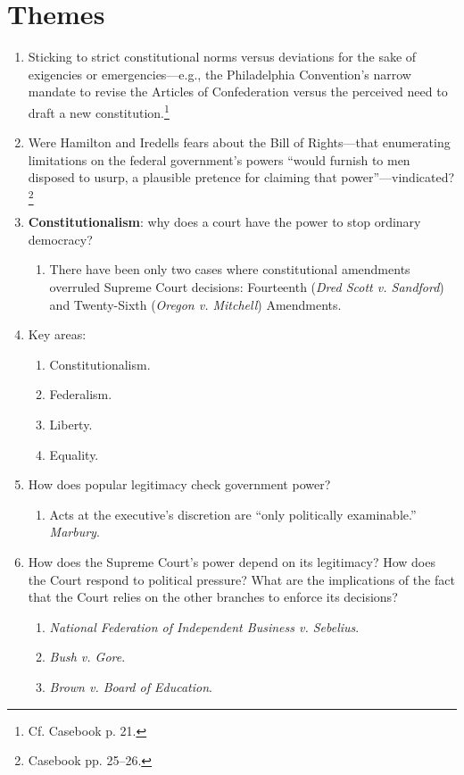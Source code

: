 \section{Themes}

\begin{enumerate}
    \item Sticking to strict constitutional norms versus deviations for the 
    sake of exigencies or emergencies---e.g., the Philadelphia Convention's 
    narrow mandate to revise the Articles of Confederation versus the 
    perceived need to draft a new constitution.\footnote{Cf. Casebook p. 21.}
    \item Were Hamilton and Iredells fears about the Bill of Rights---that 
    enumerating limitations on the federal government's powers ``would furnish 
    to men disposed to usurp, a plausible pretence for claiming that 
    power''---vindicated?\footnote{Casebook pp. 25--26.}
    \item \textbf{Constitutionalism}: why does a court have the power to stop 
    ordinary democracy?
    \begin{enumerate}
        \item There have been only two cases where constitutional amendments 
        overruled Supreme Court decisions: Fourteenth (\emph{Dred Scott v. 
        Sandford}) and Twenty-Sixth (\emph{Oregon v. Mitchell}) Amendments.
    \end{enumerate}
    \item Key areas:
    \begin{enumerate}
        \item Constitutionalism.
        \item Federalism.
        \item Liberty.
        \item Equality.
    \end{enumerate}
    \item How does popular legitimacy check government power?
    \begin{enumerate}
        \item Acts at the executive's discretion are ``only politically 
        examinable.'' \emph{Marbury}.
    \end{enumerate}
    \item How does the Supreme Court's power depend on its legitimacy? How 
    does the Court respond to political pressure? What are the implications of 
    the fact that the Court relies on the other branches to enforce its 
    decisions?
    \begin{enumerate}
        \item \emph{National Federation of Independent Business v. Sebelius}.
        \item \emph{Bush v. Gore}.
        \item \emph{Brown v. Board of Education}.
    \end{enumerate}
\end{enumerate}

